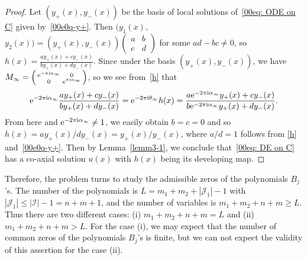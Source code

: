 \documentclass[pdftex]{sigma}
\numberwithin{equation}{section}
\def\SM#1#2#3#4{\left(\begin{smallmatrix}#1&#2\\#3&#4\end{smallmatrix}
 \right)}
\begin{document}
\begin{proof}
Let $(y_+(x), y_-(x))$ be the basis of local solutions of~\eqref{00eq: ODE on C} given by~\eqref{00e0q-y+}. Then $(y_1(x),$ $y_2(x))=(y_+(x), y_-(x))\SM{a}{b}{c}{d}$ for some $ad-bc\neq 0$, so $h(x)=\frac{ay_+(x)+cy_-(x)}{by_+(x)+dy_-(x)}$. Since under the basis $(y_{+}(x), y_{-}(x))$, we have $M_{\infty}=\SM{{\rm e}^{-\pi {\rm i} \alpha_\infty}}{0}{0}{{\rm e}^{\pi {\rm i} \alpha_\infty}}$, so we see from~\eqref{h} that
\[{\rm e}^{-2\pi {\rm i}
 \alpha_{\infty}}\frac{ay_+(x)+cy_-(x)}{by_+(x)+dy_-(x)}={\rm e}^{-2\pi {\rm i}
 \theta_{\infty}}h(x)=\frac{a{\rm e}^{-2\pi {\rm i}
 \alpha_{\infty}}y_+(x)+cy_-(x)}{b{\rm e}^{-2\pi {\rm i}
 \alpha_{\infty}}y_+(x)+dy_-(x)}.\] From here and ${\rm e}^{-2\pi {\rm i}
 \alpha_{\infty}}\neq 1$, we easily obtain $b=c=0$ and so
$h(x)=ay_+(x)/dy_-(x)=y_+(x)/y_-(x)$, where $a/d=1$ follows from
\eqref{h} and~\eqref{00e0q-y+}. Then by Lemma~\ref{lemm3-1}, we
conclude that~\eqref{00eq: DE on C} has a co-axial solution $u(x)$
with $h(x)$ being its developing map.
\end{proof}

Therefore, the problem turns to study the admissible zeros of the
polynomials $B_j$'s. The number of the polynomials is
$L=m_1+m_2+|\mathcal{J}_1|-1$ with $|\mathcal{J}_1|\leq
|\mathcal{I}|-1=n+m+1$, and the number of variables is
$m_1+m_2+n+m\geq L$. Thus there are two different cases: (i)
$m_1+m_2+n+m=L$ and (ii) $m_1+m_2+n+m>L$. For the case (i), we may
expect that the number of common zeros of the polynomials $B_j$'s is
finite, but we can not expect the validity of this assertion for the
case (ii).
\end{document}
